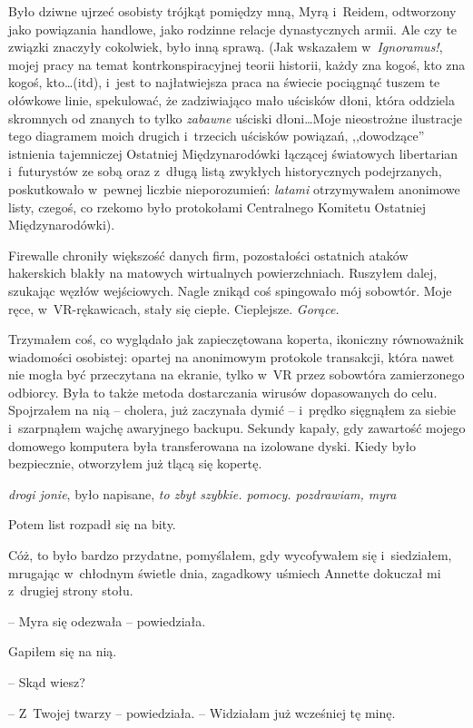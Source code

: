 \documentclass[oneside,polish,11pt,sfheadings]{mwbk}
\begin{document}
Było dziwne ujrzeć osobisty trójkąt pomiędzy mną, Myrą i~Reidem,
odtworzony jako powiązania handlowe, jako rodzinne relacje dynastycznych
armii. Ale czy te związki znaczyły cokolwiek, było inną sprawą. (Jak
wskazałem w~\emph{Ignoramus!}, mojej pracy na temat kontrkonspiracyjnej
teorii historii, każdy zna kogoś, kto zna kogoś, kto\ldots(itd), i~jest to
najłatwiejsza praca na świecie pociągnąć tuszem te ołówkowe linie,
spekulować, że zadziwiająco mało uścisków dłoni, która oddziela
skromnych od znanych to tylko \emph{zabawne} uściski dłoni\ldots Moje
nieostrożne ilustracje tego diagramem moich drugich i~trzecich uścisków
powiązań, ,,dowodzące'' istnienia tajemniczej Ostatniej Międzynarodówki
łączącej światowych libertarian i~futurystów ze sobą oraz z~długą listą
zwykłych historycznych podejrzanych, poskutkowało w~pewnej liczbie
nieporozumień: \emph{latami} otrzymywałem anonimowe listy, czegoś, co
rzekomo było protokołami Centralnego Komitetu Ostatniej
Międzynarodówki).

Firewalle chroniły większość danych firm, pozostałości ostatnich ataków
hakerskich blakły na matowych wirtualnych powierzchniach. Ruszyłem
dalej, szukając węzłów wejściowych. Nagle znikąd coś spingowało mój
sobowtór. Moje ręce, w~VR-rękawicach, stały się ciepłe. Cieplejsze.
\emph{Gorące.}

Trzymałem coś, co wyglądało jak zapieczętowana koperta, ikoniczny
równoważnik wiadomości osobistej: opartej na anonimowym protokole
transakcji, która nawet nie mogła być przeczytana na ekranie, tylko w~VR
przez sobowtóra zamierzonego odbiorcy. Była to także metoda dostarczania
wirusów dopasowanych do celu. Spojrzałem na nią -- cholera, już zaczynała
dymić -- i~prędko sięgnąłem za siebie i~szarpnąłem wajchę awaryjnego
backupu. Sekundy kapały, gdy zawartość mojego domowego komputera była
transferowana na izolowane dyski. Kiedy było bezpiecznie, otworzyłem już
tlącą się kopertę.

\emph{drogi jonie}, było napisane, \emph{to zbyt szybkie. pomocy.
pozdrawiam, myra}

Potem list rozpadł się na bity.

Cóż, to było bardzo przydatne, pomyślałem, gdy wycofywałem się i~siedziałem, mrugając w~chłodnym świetle dnia, zagadkowy uśmiech Annette
dokuczał mi z~drugiej strony stołu.

-- Myra się odezwała -- powiedziała.

Gapiłem się na nią. 

-- Skąd wiesz?

-- Z~Twojej twarzy -- powiedziała. -- Widziałam już wcześniej tę minę.
\end{document}
